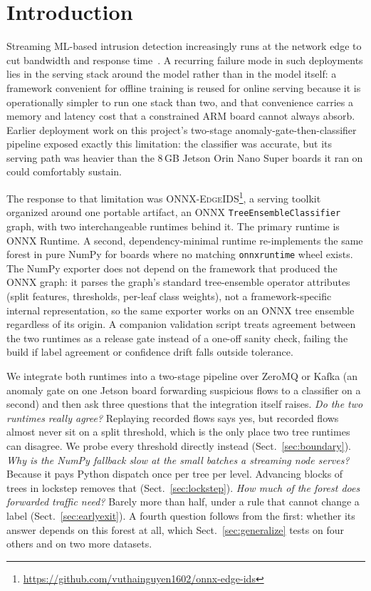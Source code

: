 \documentclass[runningheads]{llncs}
\begin{document}
\section{Introduction}

Streaming ML-based intrusion detection increasingly runs at the network edge to cut bandwidth and response time~\cite{shi2016edge,hamdan2020edge}. A recurring failure mode in such deployments lies in the serving stack around the model rather than in the model itself: a framework convenient for offline training is reused for online serving because it is operationally simpler to run one stack than two, and that convenience carries a memory and latency cost that a constrained ARM board cannot always absorb. Earlier deployment work on this project's two-stage anomaly-gate-then-classifier pipeline exposed exactly this limitation: the classifier was accurate, but its serving path was heavier than the 8\,GB Jetson Orin Nano Super boards it ran on could comfortably sustain.

The response to that limitation was \textsc{ONNX-EdgeIDS}\footnote{\url{https://github.com/vuthainguyen1602/onnx-edge-ids}}, a serving toolkit organized around one portable artifact, an ONNX \texttt{TreeEnsembleClassifier} graph, with two interchangeable runtimes behind it. The primary runtime is ONNX Runtime. A second, dependency-minimal runtime re-implements the same forest in pure NumPy for boards where no matching \texttt{onnxruntime} wheel exists. The NumPy exporter does not depend on the framework that produced the ONNX graph: it parses the graph's standard tree-ensemble operator attributes (split features, thresholds, per-leaf class weights), not a framework-specific internal representation, so the same exporter works on an ONNX tree ensemble regardless of its origin. A companion validation script treats agreement between the two runtimes as a release gate instead of a one-off sanity check, failing the build if label agreement or confidence drift falls outside tolerance.

We integrate both runtimes into a two-stage pipeline over ZeroMQ or Kafka (an anomaly gate on one Jetson board forwarding suspicious flows to a classifier on a second) and then ask three questions that the integration itself raises. \emph{Do the two runtimes really agree?} Replaying recorded flows says yes, but recorded flows almost never sit on a split threshold, which is the only place two tree runtimes can disagree. We probe every threshold directly instead (Sect.~\ref{sec:boundary}). \emph{Why is the NumPy fallback slow at the small batches a streaming node serves?} Because it pays Python dispatch once per tree per level. Advancing blocks of trees in lockstep removes that (Sect.~\ref{sec:lockstep}). \emph{How much of the forest does forwarded traffic need?} Barely more than half, under a rule that cannot change a label (Sect.~\ref{sec:earlyexit}). A fourth question follows from the first: whether its answer depends on this forest at all, which Sect.~\ref{sec:generalize} tests on four others and on two more datasets.
\end{document}
